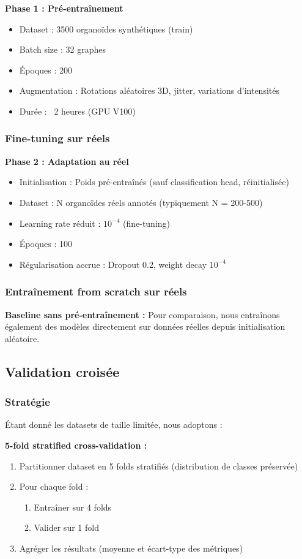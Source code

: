 \textbf{Phase 1 : Pré-entraînement}
\begin{itemize}
    \item Dataset : 3500 organoïdes synthétiques (train)
    \item Batch size : 32 graphes
    \item Époques : 200
    \item Augmentation : Rotations aléatoires 3D, jitter, variations d'intensités
    \item Durée : ~2 heures (GPU V100)
\end{itemize}

\subsubsection{Fine-tuning sur réels}

\textbf{Phase 2 : Adaptation au réel}
\begin{itemize}
    \item Initialisation : Poids pré-entraînés (sauf classification head, réinitialisée)
    \item Dataset : N organoïdes réels annotés (typiquement N = 200-500)
    \item Learning rate réduit : $10^{-4}$ (fine-tuning)
    \item Époques : 100
    \item Régularisation accrue : Dropout 0.2, weight decay $10^{-4}$
\end{itemize}

\subsubsection{Entraînement from scratch sur réels}

\textbf{Baseline sans pré-entraînement :}
Pour comparaison, nous entraînons également des modèles directement sur données réelles depuis initialisation aléatoire.

\subsection{Validation croisée}

\subsubsection{Stratégie}

Étant donné les datasets de taille limitée, nous adoptons :

\textbf{5-fold stratified cross-validation :}
\begin{enumerate}
    \item Partitionner dataset en 5 folds stratifiés (distribution de classes préservée)
    \item Pour chaque fold :
    \begin{enumerate}
        \item Entraîner sur 4 folds
        \item Valider sur 1 fold
    \end{enumerate}
    \item Agréger les résultats (moyenne et écart-type des métriques)
\end{enumerate}

